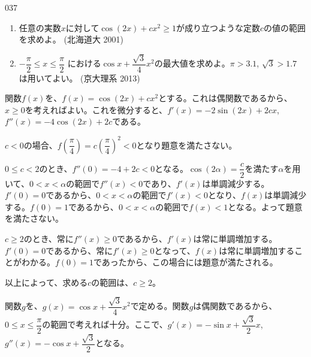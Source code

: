 \begin{thm}{037}{}{}
 \begin{enumerate}
  \item 任意の実数$x$に対して$\cos(2x)+cx^2\ge 1$が成り立つような定数$c$の値の範囲を求めよ。  (北海道大 2001)
  \item $-\dfrac{\pi}{2}\le x \le \dfrac{\pi}{2}$ における$\cos x+\dfrac{\sqrt{3}}{4}x^2$の最大値を求めよ。$\pi>3.1$, $\sqrt{3}>1.7$ は用いてよい。  (京大理系 2013)
 \end{enumerate}
\end{thm}

関数$f(x)$を、$f(x)=\cos(2x)+cx^2$とする。これは偶関数であるから、$x\ge0$を考えればよい。これを微分すると、$f'(x)=-2\sin(2x)+2cx$, $f''(x)=-4\cos(2x)+2c$である。

$c<0$の場合、$f\left(\dfrac{\pi}{4}\right)=c\left(\dfrac{\pi}{4}\right)^2<0$となり題意を満たさない。

$0\le c<2$のとき、$f''(0)=-4+2c<0$となる。$\cos(2\alpha)=\dfrac{c}{2}$を満たす$\alpha$を用いて、$0<x<\alpha$の範囲で$f''(x)<0$であり、$f'(x)$は単調減少する。$f'(0)=0$であるから、$0<x<\alpha$の範囲で$f'(x)<0$となり、$f(x)$は単調減少する。$f(0)=1$であるから、$0<x<\alpha$の範囲で$f(x)<1$となる。よって題意を満たさない。

$c\ge 2$のとき、常に$f''(x)\ge 0$であるから、$f'(x)$は常に単調増加する。$f'(0)=0$であるから、常に$f'(x)\ge 0$となって、$f(x)$は常に単調増加することがわかる。$f(0)=1$であったから、この場合には題意が満たされる。

以上によって、求める$c$の範囲は、$c\ge 2$。

関数$g$を、$g(x)=\cos x+\dfrac{\sqrt{3}}{4} x^2$で定める。関数$g$は偶関数であるから、$0\le x\le \dfrac{\pi}{2}$の範囲で考えれば十分。ここで、$g'(x)=-\sin x+\dfrac{\sqrt{3}}{2}x$, $g''(x)=-\cos x+\dfrac{\sqrt{3}}{2}$となる。

